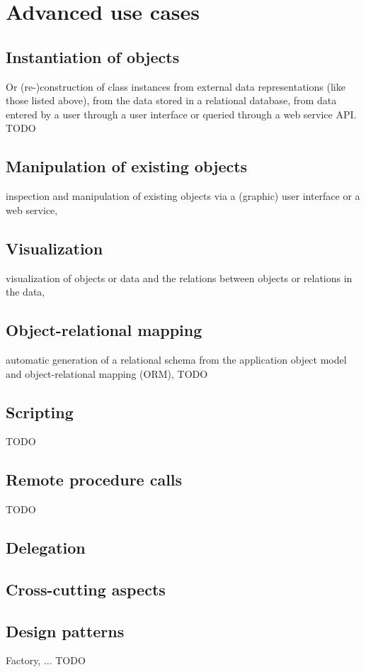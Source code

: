 \section{Advanced use cases}


\subsection{Instantiation of objects}

Or (re-)construction of class instances
from external data representations (like those listed above),
from the data stored in a relational database, from data entered by
a user through a user interface or queried through a web service API.
TODO

\subsection{Manipulation of existing objects}
inspection and manipulation of existing objects via a (graphic) user interface
or a web service,

\subsection{Visualization}

visualization of objects or data and the relations between objects or
relations in the data,

\subsection{Object-relational mapping}

automatic generation of a relational schema from the application
object model and object-relational mapping (ORM),
TODO

\subsection{Scripting}

TODO

\subsection{Remote procedure calls}

TODO

\subsection{Delegation}

\subsection{Cross-cutting aspects}

\subsection{Design patterns}

Factory, ...
TODO

